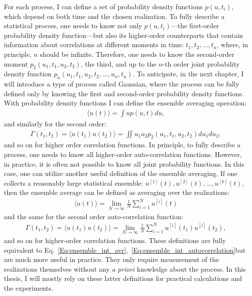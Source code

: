     For each process, I can define a set of probability density functions $p(u, t_i)$, which depend on both time and the chosen realization. To fully describe a statistical process, one needs to know not only $p(u, t_i)$—the first-order probability density function—but also its higher-order counterparts that contain information about correlations at different moments in time: $t_1, t_2, \ldots, t_n$, where, in principle, $n$ should be infinite. Therefore, one needs to know the second-order moment $p_2(u_1, t_1, u_2, t_2)$, the third, and up to the $n$-th order joint probability density function $p_n(u_1, t_1, u_2, t_2, \ldots, u_n, t_n)$.  To anticipate, in the next chapter, I will introduce a type of process called Gaussian, where the process can be fully defined only by knowing the first and second-order probability density functions. With probability density functions I can define the ensemble averaging operation:
    \begin{align}
        \langle u(t) \rangle = \int u p(u, t) du,
        \label{Eq:ensemble_int_avr}
    \end{align}
    and similarly for the second order:
    \begin{align}
        \Gamma(t_1, t_2) = \langle u(t_1)u(t_2) \rangle = \iint u_1u_2 p_2(u_1, t_1, u_2, t_2) du_1du_2,
        \label{Eq:ensemble_int_autocorrelation}
    \end{align}
    and so on for higher order correlation functions. In principle, to fully describe a process, one needs to know all higher-order auto-correlation functions. However, in practice, it is often not possible to know all joint probability functions. In this case, one can utilize another useful definition of the ensemble averaging. If one collects a reasonably large statistical ensemble: $u^{[1]}(t), u^{[2]}(t), \ldots, u^{[k]}(t)$, then the ensemble average can be defined as averaging over the realisations:
    \begin{align}
        \langle u(t) \rangle = \lim_{N\to\infty} \frac{1}{N}\sum_{i=1}^{N} u^{[i]}(t)
        \label{Eq:ensemble_avr}
    \end{align}
    and the same for the second order auto-correlation function:
    \begin{align}
        \Gamma(t_1, t_2) = \langle u(t_1)u(t_2) \rangle = \lim_{N\to\infty} \frac{1}{N}\sum_{i=1}^{N} u^{[i]}(t_1)u^{[i]}(t_2),
        \label{Eq:ensemble_autocorrelation}
    \end{align}
    and so on for higher-order correlation functions. These definitions are fully equivalent to Eq.~\ref{Eq:ensemble_int_avr},~\ref{Eq:ensemble_int_autocorrelation}but are much more useful in practice. They only require measurement of the realizations themselves without any \textit{a priori} knowledge about the process. In this thesis, I will mostly rely on these latter definitions for practical calculations and the experiments.
    
